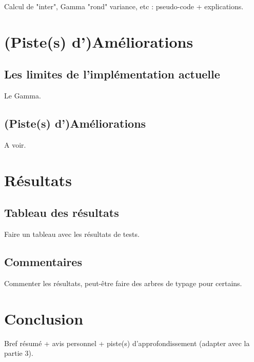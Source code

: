 \documentclass[11pt,a4paper]{article}
\begin{document}
Calcul de "inter", Gamma "rond" variance, etc : pseudo-code + explications.

\section{(Piste(s) d')Améliorations}

\subsection{Les limites de l'implémentation actuelle}

Le Gamma. 

\subsection{(Piste(s) d')Améliorations}

A voir.

\section{Résultats}

\subsection{Tableau des résultats}

Faire un tableau avec les résultats de tests.

\subsection{Commentaires}

Commenter les résultats, peut-être faire des arbres de typage pour certains.

\section*{Conclusion}

Bref résumé + avis personnel + piste(s) d'approfondissement (adapter avec la partie 3).




\end{document}
